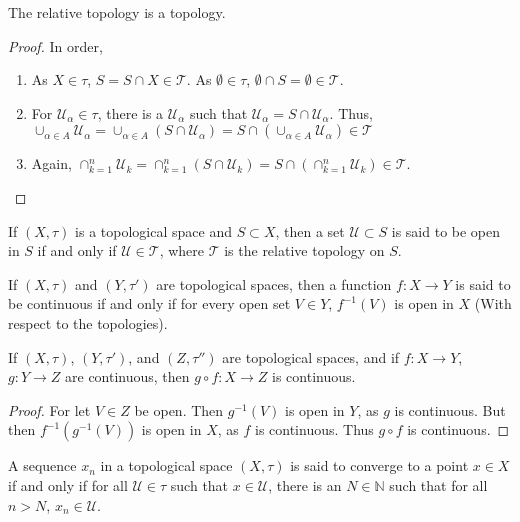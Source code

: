 \documentclass[crop=false,class=book]{standalone}
\begin{document}
\begin{theorem}
The relative topology is a topology.
\end{theorem}
\begin{proof}
In order,
\begin{enumerate}
\item As $X\in \tau$, $S=S\cap X \in \mathscr{T}$. As $\emptyset\in \tau$, $\emptyset\cap S = \emptyset \in \mathscr{T}$. 
\item For $\mathscr{U}_\alpha\in \mathscr{\tau}$, there is a $\mathcal{U}_\alpha$ such that $\mathscr{U}_\alpha = S\cap \mathcal{U}_\alpha$. Thus, $\cup_{\alpha \in A} \mathscr{U}_\alpha = \cup_{\alpha \in A}(S\cap \mathcal{U}_\alpha) = S\cap (\cup_{\alpha \in A}\mathscr{U}_\alpha)\in \mathscr{T}$
\item Again, $\cap_{k=1}^{n} \mathscr{U}_k = \cap_{k=1}^{n}(S\cap \mathcal{U}_k) = S\cap (\cap_{k=1}^{n} \mathcal{U}_k)\in \mathscr{T}$.
\end{enumerate}
\end{proof}
\begin{definition}
If $(X,\tau)$ is a topological space and $S\subset X$, then a set $\mathcal{U}\subset S$ is said to be open in $S$ if and only if $\mathcal{U}\in \mathscr{T}$, where $\mathscr{T}$ is the relative topology on $S$.
\end{definition}
\begin{definition}
If $(X,\tau)$ and $(Y,\tau')$ are topological spaces, then a function $f:X\rightarrow Y$ is said to be continuous if and only if for every open set $V\in Y$, $f^{-1}(V)$ is open in $X$ (With respect to the topologies).
\end{definition}
\begin{theorem}
If $(X,\tau)$, $(Y,\tau')$, and $(Z,\tau'')$ are topological spaces, and if $f:X\rightarrow Y$, $g:Y\rightarrow Z$ are continuous, then $g\circ f:X\rightarrow Z$ is continuous.
\end{theorem}
\begin{proof}
For let $V\in Z$ be open. Then $g^{-1}(V)$ is open in $Y$, as $g$ is continuous. But then $f^{-1}(g^{-1}(V))$ is open in $X$, as $f$ is continuous. Thus $g\circ f$ is continuous.
\end{proof}
\begin{definition}
A sequence $x_n$ in a topological space $(X,\tau)$ is said to converge to a point $x\in X$ if and only if for all $\mathcal{U}\in \tau$ such that $x\in \mathcal{U}$, there is an $N\in \mathbb{N}$ such that for all $n>N$, $x_n \in \mathcal{U}$.
\end{definition}
\end{document}
